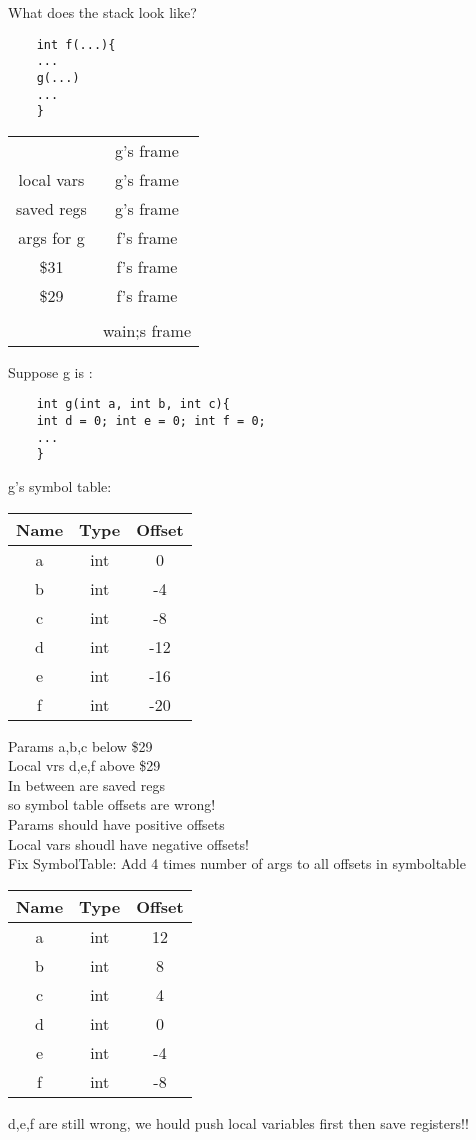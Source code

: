 \documentclass[12pt]{article}
\begin{document}
	What does the stack look like?\\
	\begin{verbatim}
	int f(...){
	...
	g(...)
	...
	}
	\end{verbatim}
	
	\begin{tabular}{|c| c}
		& g's frame \\
		local vars & g's frame\\
		saved regs & g's frame \\ \hline
		args for g & f's frame \\
		\$31 & f's frame \\
		\$29 & f's frame \\
		& \\ \hline
		& wain;s frame \\ \hline
	\end{tabular}
	
	Suppose g is :\\
	\begin{verbatim}
	int g(int a, int b, int c){
	int d = 0; int e = 0; int f = 0;
	...
	}
	\end{verbatim}
	g's symbol table:\\
	\begin{tabular}{c | c | c }
		Name & Type & Offset \\ \hline
		a & int & 0\\
		b & int & -4\\
		c & int & -8\\
		d & int & -12\\
		e & int & -16\\
		f & int & -20\\
	\end{tabular}
	
	Params a,b,c below \$29\\
	Local vrs d,e,f above \$29\\
	In between are saved regs\\
	so symbol table offsets are wrong!\\
	
	Params should have positive offsets\\
	Local vars shoudl have negative offsets!\\
	
	Fix SymbolTable: Add 4 times number of args to all offsets in symboltable\\
	
	\begin{tabular}{c | c | c}
		Name & Type & Offset \\ \hline
		a & int & 12 \\
		b & int & 8 \\
		c & int & 4 \\
		d & int & 0 \\
		e & int & -4 \\
		f & int & -8 \\
	\end{tabular}
	
	d,e,f are still wrong, we hould push local variables first then save registers!!\\
	
\end{document}

